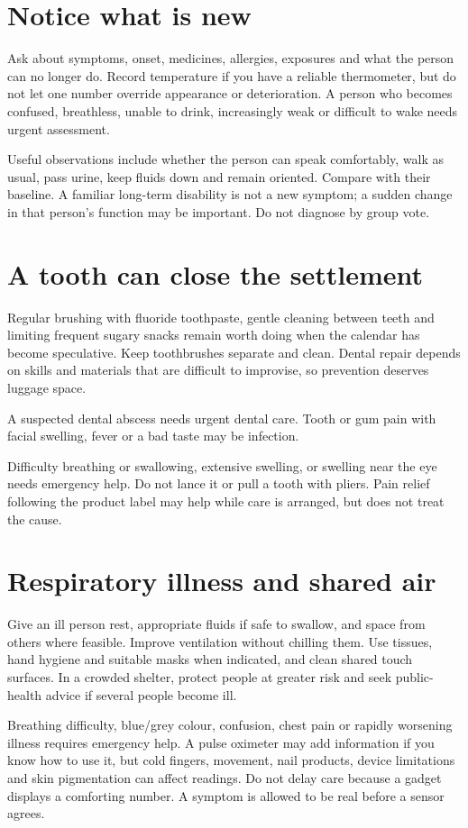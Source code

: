 \documentclass[10pt,openright]{book}
\begin{document}
\section*{Notice what is new}
Ask about symptoms, onset, medicines, allergies, exposures and what the person can no longer do. Record temperature if you have a reliable thermometer, but do not let one number override appearance or deterioration. A person who becomes confused, breathless, unable to drink, increasingly weak or difficult to wake needs urgent assessment.

Useful observations include whether the person can speak comfortably, walk as usual, pass urine, keep fluids down and remain oriented. Compare with their baseline. A familiar long-term disability is not a new symptom; a sudden change in that person's function may be important. Do not diagnose by group vote.

\section*{A tooth can close the settlement}
Regular brushing with fluoride toothpaste, gentle cleaning between teeth and limiting frequent sugary snacks remain worth doing when the calendar has become speculative. Keep toothbrushes separate and clean. Dental repair depends on skills and materials that are difficult to improvise, so prevention deserves luggage space.

A suspected dental abscess needs urgent dental care. Tooth or gum pain with facial swelling, fever or a bad taste may be infection.

Difficulty breathing or swallowing, extensive swelling, or swelling near the eye needs emergency help. Do not lance it or pull a tooth with pliers. Pain relief following the product label may help while care is arranged, but does not treat the cause.

\section*{Respiratory illness and shared air}
Give an ill person rest, appropriate fluids if safe to swallow, and space from others where feasible. Improve ventilation without chilling them. Use tissues, hand hygiene and suitable masks when indicated, and clean shared touch surfaces. In a crowded shelter, protect people at greater risk and seek public-health advice if several people become ill.

Breathing difficulty, blue/grey colour, confusion, chest pain or rapidly worsening illness requires emergency help. A pulse oximeter may add information if you know how to use it, but cold fingers, movement, nail products, device limitations and skin pigmentation can affect readings. Do not delay care because a gadget displays a comforting number. A symptom is allowed to be real before a sensor agrees.
\end{document}
